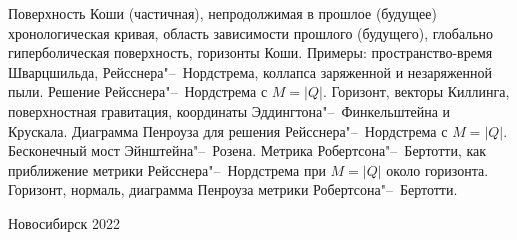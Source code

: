 \documentclass[12pt,pagesize,paper=192mm:108mm,landscape]{scrbook}
\begin{document}
\begin{titlepage}
  \vspace*{-0.5em}
  \begin{center}    

    



     \vfill

     \normalsize
     \begin{minipage}{0.8\linewidth}
      Поверхность Коши (частичная), непродолжимая в прошлое (будущее)
      хронологическая кривая, область зависимости прошлого (будущего),
      глобально гиперболическая поверхность, горизонты Коши. Примеры:
      пространство-время Шварцшильда, Рейсснера"--~Нордстрема, коллапса
      заряженной и незаряженной пыли. Решение Рейсснера"--~Нордстрема с
      $M=|Q|$. Горизонт, векторы Киллинга, поверхностная гравитация,
      координаты Эддингтона"--~Финкельштейна и Крускала. Диаграмма
      Пенроуза для решения Рейсснера"--~Нордстрема с $M=|Q|$. Бесконечный
      мост Эйнштейна"--~Розена. Метрика Робертсона"--~Бертотти, как
      приближение метрики Рейсснера"--~Нордстрема при $M=|Q|$ около
      горизонта. Горизонт, нормаль, диаграмма Пенроуза метрики
      Робертсона"--~Бертотти.
     \end{minipage}
    \vfill

    \normalsize \ccbysa\hspace{0.5em}  Новосибирск 2022
  \end{center}
\end{titlepage}
\end{document}
